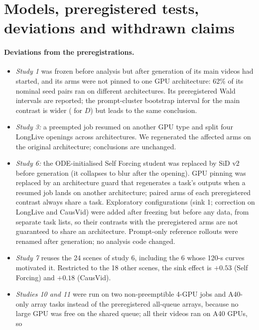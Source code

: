 \section{Models, preregistered tests, deviations and withdrawn claims}\label{app:prereg}



\paragraph{Deviations from the preregistrations.}
\begin{itemize}
\item \emph{Study 1} was frozen before analysis but after generation of its main videos had started, and its arms were
not pinned to one GPU architecture: 62\% of its nominal seed pairs ran on different architectures. Its preregistered
Wald intervals are reported; the prompt-cluster bootstrap interval for the main contrast is wider (
for $D$) but leads to the same conclusion.
\item \emph{Study 3:} a preempted job resumed on another GPU type and split four LongLive openings across
architectures. We regenerated the affected arms on the original architecture; conclusions are unchanged.
\item \emph{Study 6:} the ODE-initialised Self Forcing student was replaced by SiD v2 before generation (it collapses to
blur after the opening). GPU pinning was replaced by an architecture guard that regenerates a task's outputs when a
resumed job lands on another architecture; paired arms of each preregistered contrast always share a task. Exploratory
configurations (sink 1; correction on LongLive and CausVid) were added after freezing but before any data, from
separate task lists, so their contrasts with the preregistered arms are not guaranteed to share an architecture.
Prompt-only reference rollouts were renamed after generation; no analysis code changed.
\item \emph{Study 7} reuses the 24 scenes of study 6, including the 6 whose 120-s curves motivated it. Restricted to the
18 other scenes, the sink effect is $+0.53$  (Self Forcing) and $+0.18$  (CausVid).
\item \emph{Studies 10 and 11} were run on two non-preemptible 4-GPU jobs and A40-only array tasks instead of the
preregistered all-queue arrays, because no large GPU was free on the shared queue; all their videos ran on A40 GPUs, so

\end{itemize}
